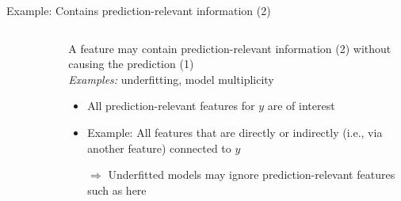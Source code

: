 \documentclass[11pt,compress,t,notes=noshow, aspectratio=169, xcolor=table]{beamer}
\begin{document}
\begin{frame}[c]{Example: Contains prediction-relevant information (2)}
\begin{columns}[c]
\begin{column}{0.6\textwidth}
\begin{figure}
\end{figure} 
  \end{column}
  \begin{column}{0.4\textwidth}
  A feature may contain prediction-relevant information (2) without causing the prediction (1)\\ 
  \textit{Examples:} underfitting, model multiplicity
  \lz
  \pause
      \begin{itemize}
      \item All prediction-relevant features for $y$ are of interest
      \item Example: All features that are directly or indirectly (i.e., via another feature) connected to $y$ 
      \item[$\Rightarrow$] Underfitted models may ignore prediction-relevant features such as  here
  \end{itemize}
  \end{column}
\end{columns}
\end{frame}
\end{document}
